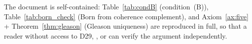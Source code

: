 \documentclass[11pt,a4paper]{article}
\theoremstyle{definition}
\begin{document}
The document is self-contained: Table~\ref{tab:condB} (condition~(B)), Table~\ref{tab:born_check} (Born from coherence complement), and Axiom~\ref{ax:five} + Theorem~\ref{thm:gleason} (Gleason uniqueness) are reproduced in full, so that a reader without access to D29, \cite{Born_PDL_2026}, or \cite{Gleason_PDL_2026} can verify the argument independently.


\nocite{*}

\end{document}
